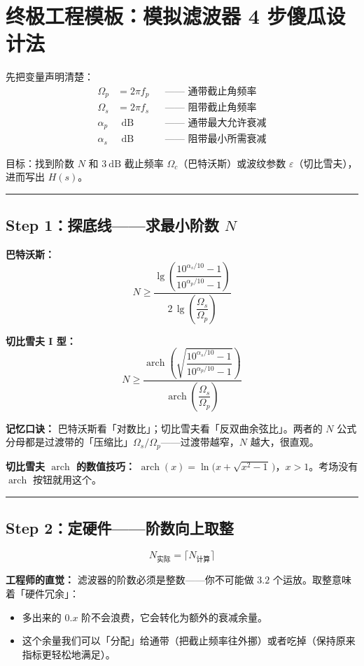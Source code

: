 \documentclass[12pt,a4paper]{ctexart}
\newcommand{\Omegac}{\Omega_c}
\newcommand{\Omegap}{\Omega_p}
\newcommand{\Omegas}{\Omega_s}
\newcommand{\db}{\ \mathrm{dB}}
\newcommand{\arch}{\operatorname{arch}}
\newcommand{\ceil}[1]{\bigl\lceil #1 \bigr\rceil}
\begin{document}
\newpage
\section{终极工程模板：模拟滤波器 4 步傻瓜设计法}

先把变量声明清楚：
\[
\begin{aligned}
\Omegap &= 2\pi f_p &&\text{—— 通带截止角频率} \\
\Omegas &= 2\pi f_s &&\text{—— 阻带截止角频率} \\
\alpha_p &\ \db &&\text{—— 通带最大允许衰减} \\
\alpha_s &\ \db &&\text{—— 阻带最小所需衰减}
\end{aligned}
\]

目标：找到阶数 $N$ 和 $3\db$ 截止频率 $\Omegac$（巴特沃斯）或波纹参数 $\varepsilon$（切比雪夫），进而写出 $H(s)$。

\bigskip
\hrule
\subsection*{Step 1：探底线——求最小阶数 $N$}

\textbf{巴特沃斯：}
\[
N \ge \frac{\lg\!\left(\dfrac{10^{\alpha_s/10}-1}{10^{\alpha_p/10}-1}\right)}
                {2\,\lg\!\left(\dfrac{\Omegas}{\Omegap}\right)}
\]

\textbf{切比雪夫 I 型：}
\[
N \ge \frac{\arch\!\left(\sqrt{\dfrac{10^{\alpha_s/10}-1}{10^{\alpha_p/10}-1}}\right)}
                {\arch\!\left(\dfrac{\Omegas}{\Omegap}\right)}
\]

\textbf{记忆口诀：} 巴特沃斯看「对数比」；切比雪夫看「反双曲余弦比」。两者的 $N$ 公式分母都是过渡带的「压缩比」$\Omegas/\Omegap$——过渡带越窄，$N$ 越大，很直观。

\textbf{切比雪夫 $\arch$ 的数值技巧：} $\arch(x) = \ln\!\bigl(x + \sqrt{x^2-1}\,\bigr)$，$x>1$。考场没有 $\arch$ 按钮就用这个。

\bigskip
\hrule
\subsection*{Step 2：定硬件——阶数向上取整}

\[
N_{\text{实际}} = \ceil{N_{\text{计算}}}
\]

\textbf{工程师的直觉：} 滤波器的阶数必须是整数——你不可能做 $3.2$ 个运放。取整意味着「硬件冗余」：
\begin{itemize}
    \item 多出来的 $0.x$ 阶不会浪费，它会转化为额外的衰减余量。
    \item 这个余量我们可以「分配」给通带（把截止频率往外挪）或者吃掉（保持原来指标更轻松地满足）。
\end{itemize}
\end{document}
